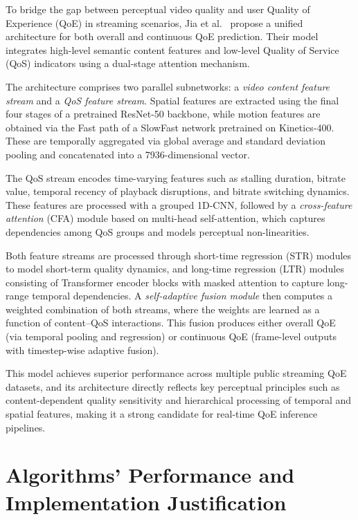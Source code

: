 To bridge the gap between perceptual video quality and user Quality of Experience (QoE) in streaming scenarios, Jia et al.~\cite{jia2024continuous} propose a unified architecture for both overall and continuous QoE prediction. Their model integrates high-level semantic content features and low-level Quality of Service (QoS) indicators using a dual-stage attention mechanism. 

The architecture comprises two parallel subnetworks: a \textit{video content feature stream} and a \textit{QoS feature stream}. Spatial features are extracted using the final four stages of a pretrained ResNet-50 backbone, while motion features are obtained via the Fast path of a SlowFast network pretrained on Kinetics-400. These are temporally aggregated via global average and standard deviation pooling and concatenated into a 7936-dimensional vector.

The QoS stream encodes time-varying features such as stalling duration, bitrate value, temporal recency of playback disruptions, and bitrate switching dynamics. These features are processed with a grouped 1D-CNN, followed by a \textit{cross-feature attention} (CFA) module based on multi-head self-attention, which captures dependencies among QoS groups and models perceptual non-linearities.

Both feature streams are processed through short-time regression (STR) modules to model short-term quality dynamics, and long-time regression (LTR) modules consisting of Transformer encoder blocks with masked attention to capture long-range temporal dependencies. A \textit{self-adaptive fusion module} then computes a weighted combination of both streams, where the weights are learned as a function of content–QoS interactions. This fusion produces either overall QoE (via temporal pooling and regression) or continuous QoE (frame-level outputs with timestep-wise adaptive fusion).

This model achieves superior performance across multiple public streaming QoE datasets, and its architecture directly reflects key perceptual principles such as content-dependent quality sensitivity and hierarchical processing of temporal and spatial features, making it a strong candidate for real-time QoE inference pipelines.

\section{Algorithms' Performance and Implementation Justification}  
\label{sec:performance_conclusions}

